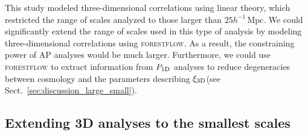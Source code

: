 \documentclass[longauth]{aa}
\newcommand{\poned}{\ensuremath{P_{\rm 1D}}\xspace}
\newcommand{\xithreed}{\ensuremath{\xi_{\rm 3D}}\xspace}
\newcommand{\forestflow}{\textsc{forestflow}\xspace}
\newcommand{\hMpc}{h^{-1}\,\mathrm{Mpc}}
\begin{document}
This study modeled three-dimensional correlations using linear theory, which restricted the range of scales analyzed to those larger than $25 \hMpc$. We could significantly extend the range of scales used in this type of analysis by modeling three-dimensional correlations using \forestflow. As a result, the constraining power of AP analyses would be much larger. Furthermore, we could use \forestflow to extract information from \poned analyses to reduce degeneracies between cosmology and the parameters describing \xithreed (see Sect.~\ref{sec:discussion_large_small}).


\subsection{Extending 3D analyses to the smallest scales}
\end{document}
